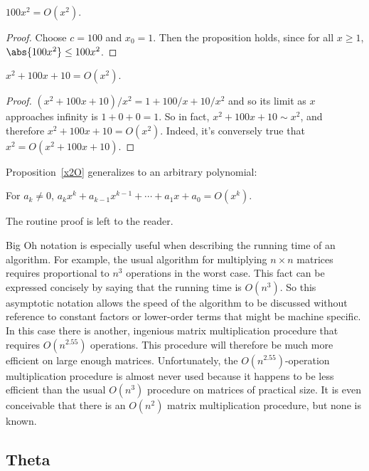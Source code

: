 \begin{proposition}
$100x^2 = O(x^2)$.
\end{proposition}

\begin{proof}
Choose $c = 100$ and $x_0 = 1$.  Then the proposition holds, since for all
$x \geq 1$, $\abs{100x^2} \leq 100 x^2$.
\end{proof}

\begin{proposition}\label{x2O}
$x^2 + 100x + 10 = O(x^2)$.
\end{proposition}

\begin{proof}
$(x^2 + 100x + 10)/x^2 = 1 + 100/x + 10/x^2$ and so its limit as $x$
approaches infinity is $1 + 0 + 0 = 1$.  So in fact, $x^2 + 100x + 10 \sim
x^2$, and therefore $x^2 + 100x + 10 = O(x^2)$.  Indeed, it's conversely
true that $x^2= O(x^2 + 100x + 10)$.
\end{proof}

Proposition~\ref{x2O} generalizes to an arbitrary polynomial:
\begin{proposition}
For $a_k\neq 0$, $a_k x^k + a_{k-1} x^{k-1} + \cdots + a_1x + a_0 = O(x^k)$.
\end{proposition}
The routine proof is left to the reader.

Big Oh notation is especially useful when describing the running time of
an algorithm.  For example, the usual algorithm for multiplying $n \times
n$ matrices requires proportional to $n^3$ operations in the worst case.
This fact can be expressed concisely by saying that the running time is
$O(n^3)$.  So this asymptotic notation allows the speed of the algorithm
to be discussed without reference to constant factors or lower-order terms
that might be machine specific.  In this case there is another, ingenious
matrix multiplication procedure that requires $O(n^{2.55})$ operations.
This procedure will therefore be much more efficient on large enough
matrices.  Unfortunately, the $O(n^{2.55})$-operation multiplication
procedure is almost never used because it happens to be less efficient
than the usual $O(n^3)$ procedure on matrices of practical size.  It is
even conceivable that there is an $O(n^2)$ matrix multiplication
procedure, but none is known.

\subsection{Theta}

